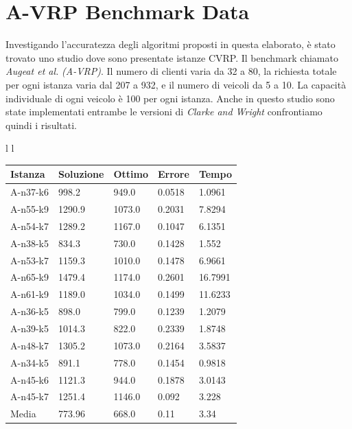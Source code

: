 \documentclass[]{article}
\begin{document}
\section{A-VRP Benchmark Data}
Investigando l'accuratezza degli algoritmi proposti in questa elaborato, è stato trovato uno studio \cite{studio} dove sono presentate istanze CVRP. Il benchmark chiamato \textit{Augeat et al.}  \emph{(A-VRP)}. Il numero di clienti varia da 32 a 80, la richiesta totale per ogni istanza varia dal 207 a 932, e il numero di veicoli da 5 a 10. La capacità individuale di ogni veicolo è 100 per ogni istanza.
Anche in questo studio sono state implementati entrambe le versioni di \emph{Clarke and Wright} confrontiamo quindi i risultati.


\begin{tabular}{l l}
	\small
	\begin{tabular}{||l | l l l l||} 
		\hline
		Istanza & Soluzione & Ottimo & Errore & Tempo \\ [0.5ex] 
		\hline\hline
	A-n37-k6 & \cellcolor{green} 998.2 & 949.0 & 0.0518 & 1.0961  \\
	A-n55-k9 & 1290.9 & 1073.0 & 0.2031 & 7.8294  \\
	A-n54-k7 & \cellcolor{green} 1289.2 & 1167.0 & 0.1047 & 6.1351  \\
	A-n38-k5 & \cellcolor{green}  834.3 & 730.0 & 0.1428 & 1.552  \\
	A-n53-k7 & \cellcolor{green} 1159.3 & 1010.0 & 0.1478 & 6.9661  \\
	A-n65-k9 & \cellcolor{green} 1479.4 & 1174.0 & 0.2601 & 16.7991  \\
	A-n61-k9 & \cellcolor{green} 1189.0 & 1034.0 & 0.1499 & 11.6233  \\
	A-n36-k5 & \cellcolor{green} 898.0 & 799.0 & 0.1239 & 1.2079  \\
	A-n39-k5 &  \cellcolor{green} 1014.3 & 822.0 & 0.2339 & 1.8748  \\
	A-n48-k7 & 1305.2 & 1073.0 & 0.2164 & 3.5837  \\
	A-n34-k5 & 891.1 & 778.0 & 0.1454 & 0.9818  \\
	A-n45-k6 & 1121.3 & 944.0 & 0.1878 & 3.0143  \\
	A-n45-k7 & \cellcolor{green} 1251.4 & 1146.0 & 0.092 & 3.228  \\
	\hline
	Media & 773.96 & 668.0 & 0.11 & 3.34  \\
		[1ex]
		\hline
	\end{tabular}
	
	\small
	

\end{tabular}
\end{document}

